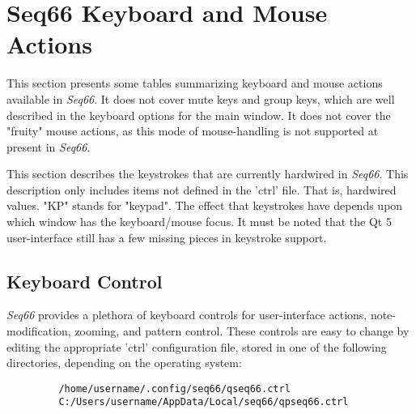 %
%
%

\section{Seq66 Keyboard and Mouse Actions}
\label{sec:kbd_mouse_actions}

   This section presents some tables summarizing keyboard and mouse actions
   available in \textsl{Seq66}.
   It does not cover mute keys and group keys, which are well
   described in the keyboard options for the main window.
   It does not cover the "fruity" mouse actions, as this mode of mouse-handling
   is not supported at present in \textsl{Seq66}.


   This section describes the keystrokes that are currently hardwired
   in \textsl{Seq66}.
   This description only includes items not defined in the 'ctrl' file.
   That is, hardwired values.
   "KP" stands for "keypad".
   The effect that keystrokes have depends upon
   which window has the keyboard/mouse focus.
   It must be noted that the Qt 5 user-interface still has a few missing pieces
   in keystroke support.

\subsection{Keyboard Control}
\label{subsec:kbd_mouse_keyboard_control}

   \textsl{Seq66} provides a plethora of keyboard controls for user-interface
   actions, note-modification, zooming, and pattern control.
   These controls are easy to change by editing the appropriate 'ctrl'
   configuration file, stored in one of the following directories, depending on
   the operating system:
   
   \begin{verbatim}
         /home/username/.config/seq66/qseq66.ctrl
         C:/Users/username/AppData/Local/seq66/qpseq66.ctrl
   \end{verbatim}

